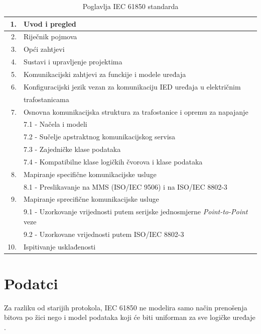 \documentclass[times, utf8, zavrsni]{fer}
\begin{document}
\begin{table}[tph]
    \centering
    \begin{tabular}{ |r|l| } 
        \hline
        1. & Uvod i pregled \\ 
        \hline
        2. & Riječnik pojmova \\ 
        \hline
        3. & Opći zahtjevi \\ 
        \hline
        4. & Sustavi i upravljenje projektima \\ 
        \hline
        5. & Komunikacijski zahtjevi za funckije i modele uređaja \\ 
        \hline
        6. & Konfiguracijski jezik vezan za komunikaciju IED uređaja u električnim \\
           & trafostanicama \\ 
        \hline
        7. & Osnovna komunikacijska struktura za trafostanice i opremu za napajanje \\
        \hline
        & 7.1 - Načela i modeli \\
        & 7.2 - Sučelje apstraktnog komunikacijskog servisa \\
        & 7.3 - Zajedničke klase podataka \\ 
        & 7.4 - Kompatibilne klase logičkih čvorova i klase podataka \\ 
        \hline
        8. & Mapiranje specifične komunikacijske usluge \\
        \hline
        & 8.1 - Preslikavanje na MMS (ISO/IEC 9506) i na ISO/IEC 8802-3 \\
        \hline
        9. & Mapiranje sprecifične komunikacijske usluge \\
        \hline
        & 9.1 - Uzorkovanje vrijednosti putem serijske jednosmjerne \textit{Point-to-Point} veze \\ 
        & 9.2 - Uzorkovane vrijednosti putem ISO/IEC 8802-3 \\
        \hline
        10. & Ispitivanje usklađenosti \\
        \hline
    \end{tabular}
    \caption{Poglavlja IEC 61850 standarda}
    \label{tab:iec-chapters}
\end{table}

\chapter{Podatci}
Za razliku od starijih protokola, IEC 61850 ne modelira samo način prenošenja bitova po žici nego i model podataka koji će biti uniforman za sve logičke uređaje .
\end{document}
